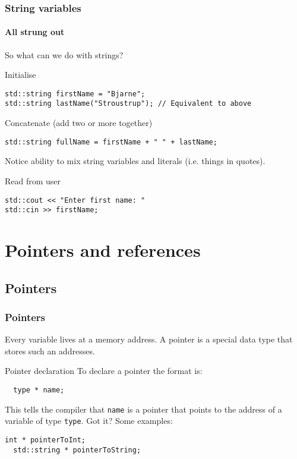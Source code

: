 \documentclass{beamer}
\begin{document}
\begin{frame}[fragile]
  \frametitle{String variables}
  \framesubtitle{All strung out}
  So what can we do with strings?
	
  \begin{block}{Initialise}
      \begin{lstlisting}
std::string firstName = "Bjarne";
std::string lastName("Stroustrup"); // Equivalent to above
      \end{lstlisting}
  \end{block}
  \pause
  \begin{block}{Concatenate (add two or more together)}
      \begin{lstlisting}
std::string fullName = firstName + " " + lastName;
      \end{lstlisting}
			Notice ability to mix string variables and literals (i.e. things in quotes).      
  \end{block}
  \pause
  \begin{block}{Read from user}
    \begin{lstlisting}
std::cout << "Enter first name: "
std::cin >> firstName;
    \end{lstlisting}
  \end{block}
\end{frame}

\section{Pointers and references}

\subsection{Pointers}

\begin{frame}[fragile]
  \frametitle{Pointers}
  Every variable lives at a memory address.  A pointer is a special data type that stores such an addresses.
  \begin{block}{Pointer declaration}
  To declare a pointer the format is:
	  \begin{lstlisting}
  type * name;
	  \end{lstlisting}
	  This tells the compiler that \texttt{name} is a pointer that points to the address of a variable of type \texttt{type}.  Got it?
	  \pause\newline
	  Some examples:
	  \begin{lstlisting}[belowskip=0pt]
  int * pointerToInt;
  std::string * pointerToString;
	  \end{lstlisting}
  \end{block}
\end{frame}
\end{document}
